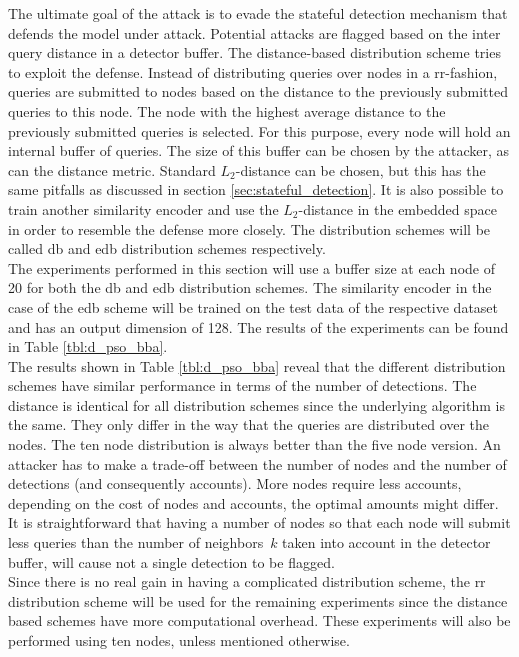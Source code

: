 The ultimate goal of the attack is to evade the stateful detection mechanism that defends the model under attack. Potential attacks are flagged based on the inter query distance in a detector buffer. The distance-based distribution scheme tries to exploit the defense. Instead of distributing queries over nodes in a \gls{rr}-fashion, queries are submitted to nodes based on the distance to the previously submitted queries to this node. The node with the highest average distance to the previously submitted queries is selected. For this purpose, every node will hold an internal buffer of queries. The size of this buffer can be chosen by the attacker, as can the distance metric. Standard $L_2$-distance can be chosen, but this has the same pitfalls as discussed in section \ref{sec:stateful_detection}. It is also possible to train another similarity encoder and use the $L_2$-distance in the embedded space in order to resemble the defense more closely. The distribution schemes will be called \gls{db} and \gls{edb} distribution schemes respectively.\\

The experiments performed in this section will use a buffer size at each node of 20 for both the \gls{db} and \gls{edb} distribution schemes. The similarity encoder in the case of the \gls{edb} scheme will be trained on the test data of the respective dataset and has an output dimension of 128. The results of the experiments can be found in Table \ref{tbl:d_pso_bba}.\\

The results shown in Table \ref{tbl:d_pso_bba} reveal that the different distribution schemes have similar performance in terms of the number of detections. The distance is identical for all distribution schemes since the underlying algorithm is the same. They only differ in the way that the queries are distributed over the nodes. The ten node distribution is always better than the five node version. An attacker has to make a trade-off between the number of nodes and the number of detections (and consequently accounts). More nodes require less accounts, depending on the cost of nodes and accounts, the optimal amounts might differ. It is straightforward that having a number of nodes so that each node will submit less queries than the number of neighbors~$k$ taken into account in the detector buffer, will cause not a single detection to be flagged. \\

Since there is no real gain in having a complicated distribution scheme, the \gls{rr} distribution scheme will be used for the remaining experiments since the distance based schemes have more computational overhead. These experiments will also be performed using ten nodes, unless mentioned otherwise. 

